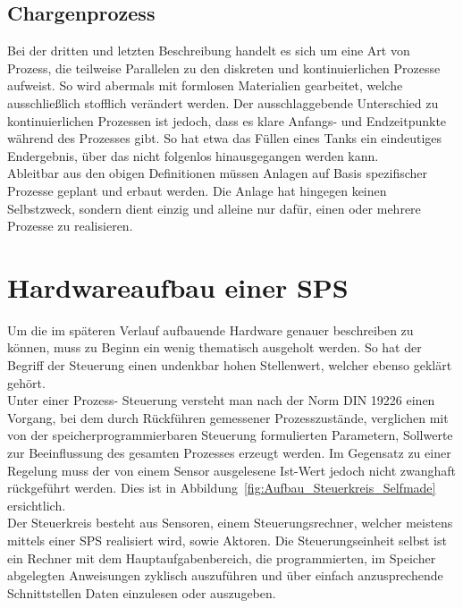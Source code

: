 	\subsection{Chargenprozess}
	Bei der dritten und letzten Beschreibung handelt es sich um eine Art von Prozess, die teilweise Parallelen zu den diskreten und kontinuierlichen Prozesse aufweist. So wird abermals mit formlosen Materialien gearbeitet, welche ausschließlich stofflich verändert werden. Der ausschlaggebende Unterschied zu kontinuierlichen Prozessen ist jedoch, dass es klare Anfangs- und Endzeitpunkte während des Prozesses gibt. So hat etwa das Füllen eines Tanks ein eindeutiges Endergebnis, über das nicht folgenlos hinausgegangen werden kann.\\

	Ableitbar aus den obigen Definitionen müssen Anlagen auf Basis spezifischer Prozesse geplant und erbaut werden. Die Anlage hat hingegen keinen Selbstzweck, sondern dient einzig und alleine nur dafür, einen oder mehrere Prozesse zu realisieren.\\

	\section{Hardwareaufbau einer SPS}
	
	Um die im späteren Verlauf aufbauende Hardware genauer beschreiben zu können, muss zu Beginn ein wenig thematisch ausgeholt werden. So hat der Begriff der Steuerung einen undenkbar hohen Stellenwert, welcher ebenso geklärt gehört.\\

	Unter einer Prozess- Steuerung versteht man nach der Norm DIN 19226 einen Vorgang, bei dem durch Rückführen gemessener Prozesszustände, verglichen mit von der speicherprogrammierbaren Steuerung formulierten Parametern, Sollwerte zur Beeinflussung des gesamten Prozesses erzeugt werden. Im Gegensatz zu einer Regelung muss der von einem Sensor ausgelesene Ist-Wert jedoch nicht zwanghaft rückgeführt werden. Dies ist in Abbildung~\ref{fig:Aufbau_Steuerkreis_Selfmade} ersichtlich.\cite{mseitz_sps}\\
	
	Der Steuerkreis besteht aus Sensoren, einem Steuerungsrechner, welcher meistens mittels einer SPS realisiert wird, sowie Aktoren. Die Steuerungseinheit selbst ist ein Rechner mit dem Hauptaufgabenbereich, die programmierten, im Speicher abgelegten Anweisungen zyklisch auszuführen und über einfach anzusprechende Schnittstellen Daten einzulesen oder auszugeben. \cite{mseitz_sps} \\
	
